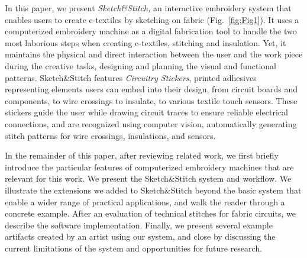 \documentclass[header.tex]{subfiles}
\begin{document}
In this paper, we present \textit{Sketch\&Stitch,} an interactive embroidery system that enables users to create e-textiles by sketching on fabric (Fig.~\ref{fig:Fig1}). It uses a computerized embroidery machine as a digital fabrication tool to handle the two most laborious steps when creating e-textiles, stitching and insulation. Yet, it maintains the physical and direct interaction between the user and the work piece during the creative tasks, designing and planning the visual and functional patterns.  Sketch\&Stitch features \textit{Circuitry Stickers}, printed adhesives representing elements users can embed into their design, from circuit boards and components, to wire crossings to insulate, to various textile touch sensors. These stickers guide the user while drawing circuit traces to ensure reliable electrical connections, and are recognized using computer vision, automatically generating stitch patterns for wire crossings, insulations, and sensors.


In the remainder of this paper, after reviewing related work, we first briefly introduce the particular features of computerized embroidery machines that are relevant for this work. We present the Sketch\&Stitch system and workflow. We illustrate the extensions we added to Sketch\&Stitch beyond the basic system that enable a wider range of practical applications, and walk the reader through a concrete example. After an evaluation of technical stitches for fabric circuits, we describe the software implementation. Finally, we present several example artifacts created by an artist using our system, and close by discussing the current limitations of the system and opportunities for future research.
\end{document}
